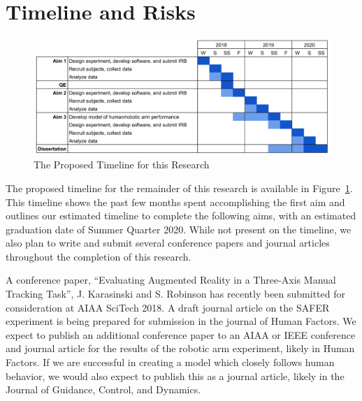 \documentclass[float=false, crop=false]{standalone}
\begin{document}
\section{Timeline and Risks}

\begin{figure}[h!]
    \begin{center}
        \includegraphics[width=\linewidth]{./../img/image1.png}
        \caption{The Proposed Timeline for this Research}
        \label{timeline}
    \end{center}
\end{figure}

The proposed timeline for the remainder of this research is available in Figure~\ref{timeline}.
This timeline shows the past few months spent accomplishing the first aim and outlines our estimated timeline to complete the following aims, with an estimated graduation date of Summer Quarter 2020.
While not present on the timeline, we also plan to write and submit several conference papers and journal articles throughout the completion of this research.

A conference paper, ``Evaluating Augmented Reality in a Three-Axis Manual Tracking Task'', J. Karasinski and S. Robinson has recently been submitted for consideration at AIAA SciTech 2018.
A draft journal article on the SAFER experiment is being prepared for submission in the journal of Human Factors.
We expect to publish an additional conference paper to an AIAA or IEEE conference and journal article for the results of the robotic arm experiment, likely in Human Factors.
If we are successful in creating a model which closely follows human behavior, we would also expect to publish this as a journal article, likely in the Journal of Guidance, Control, and Dynamics.
\end{document}
